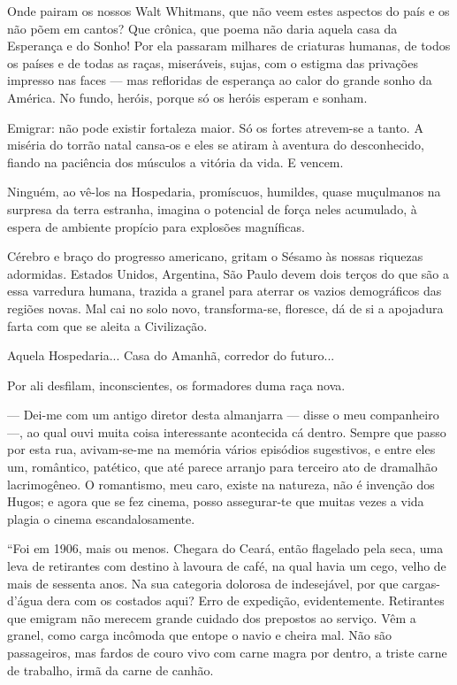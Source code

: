 Onde pairam os nossos Walt Whitmans, que não veem estes aspectos do país
e os não põem em cantos? Que crônica, que poema não daria aquela casa da
Esperança e do Sonho! Por ela passaram milhares de criaturas humanas, de
todos os países e de todas as raças, miseráveis, sujas, com o estigma
das privações impresso nas faces --- mas refloridas de esperança ao
calor do grande sonho da América. No fundo, heróis, porque só os heróis
esperam e sonham.

Emigrar: não pode existir fortaleza maior. Só os fortes atrevem-se a
tanto. A miséria do torrão natal cansa-os e eles se atiram à aventura do
desconhecido, fiando na paciência dos músculos a vitória da vida. E
vencem.

Ninguém, ao vê-los na Hospedaria, promíscuos, humildes, quase muçulmanos
na surpresa da terra estranha, imagina o potencial de força neles
acumulado, à espera de ambiente propício para explosões magníficas.

Cérebro e braço do progresso americano, gritam o Sésamo às nossas
riquezas adormidas. Estados Unidos, Argentina, São Paulo devem dois
terços do que são a essa varredura humana, trazida a granel para aterrar
os vazios demográficos das regiões novas. Mal cai no solo novo,
transforma-se, floresce, dá de si a apojadura farta com que se aleita a
Civilização.

Aquela Hospedaria... Casa do Amanhã, corredor do futuro...

Por ali desfilam, inconscientes, os formadores duma raça nova.

--- Dei-me com um antigo diretor desta almanjarra --- disse o meu
companheiro ---, ao qual ouvi muita coisa interessante acontecida cá
dentro. Sempre que passo por esta rua, avivam-se-me na memória vários
episódios sugestivos, e entre eles um, romântico, patético, que até
parece arranjo para terceiro ato de dramalhão lacrimogêneo. O
romantismo, meu caro, existe na natureza, não é invenção dos Hugos; e
agora que se fez cinema, posso assegurar-te que muitas vezes a vida
plagia o cinema escandalosamente.

``Foi em 1906, mais ou menos. Chegara do Ceará, então flagelado pela
seca, uma leva de retirantes com destino à lavoura de café, na qual
havia um cego, velho de mais de sessenta anos. Na sua categoria dolorosa
de indesejável, por que cargas-d'água dera com os costados aqui? Erro de
expedição, evidentemente. Retirantes que emigram não merecem grande
cuidado dos prepostos ao serviço. Vêm a granel, como carga incômoda que
entope o navio e cheira mal. Não são passageiros, mas fardos de couro
vivo com carne magra por dentro, a triste carne de trabalho, irmã da
carne de canhão.

